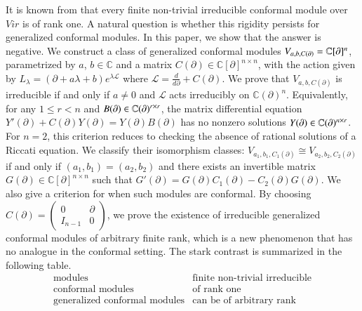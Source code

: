 \documentclass[12pt]{amsart}
\begin{document}
 It is known from \cite{CK} that every finite non-trivial irreducible conformal module over $Vir$ is of rank one. A natural question is whether this rigidity persists for generalized conformal modules. In this paper, we show that the answer is negative. We construct a class of generalized conformal modules $V_{a,b,C(\partial)}=\mathbb{C}[\partial]^n$, parametrized by $a$, $b\in \mathbb{C}$ and a matrix $C(\partial)\in \mathbb C[\partial]^{n\times n}$, with the action given by $L_\lambda = (\partial+a\lambda+b)e^{\lambda \mathcal L}$ where $\mathcal L=\frac{d}{d\partial}+C(\partial)$. We prove that $V_{a,b,C(\partial)}$ is irreducible if and only if $a\neq 0$ and $\mathcal L$ acts irreducibly on $\mathbb C(\partial)^n$. Equivalently, for any $1\leq r<n$ and $B(\partial)\in \mathbb{C}(\partial)^{r\times r}$, the matrix differential equation $Y'(\partial)+C(\partial)Y(\partial)=Y(\partial)B(\partial)$ has no nonzero solutions $Y(\partial)\in \mathbb{C}(\partial)^{n\times r}$. For $n=2$, this criterion reduces to checking the absence of rational solutions of a Riccati equation. We classify their isomorphism classes: $V_{a_1,b_1,C_1(\partial)}\cong V_{a_2,b_2,C_2(\partial)}$ if and only if $(a_1,b_1)=(a_2,b_2)$ and there exists an invertible matrix $G(\partial)\in  \mathbb{C}[\partial]^{n\times n}$ such that $G'(\partial)=G(\partial)C_1(\partial)-C_2(\partial)G(\partial)$. We also give a criterion for when such modules are conformal. By choosing $C(\partial)=\begin{pmatrix}0&\partial\\ I_{n-1}&0\end{pmatrix}$, we prove the existence of irreducible generalized conformal modules of arbitrary finite rank,  which is a new phenomenon that has no analogue in the conformal setting. The stark contrast is summarized in the following table.
 \[
\begin{array}{c|c}
\text{modules} & \text{finite non-trivial irreducible} \\
\hline
\text{conformal modules} & \text{of rank one} \\
\text{generalized conformal modules} & \text{can be of arbitrary rank}
\end{array}
\]
\end{document}
